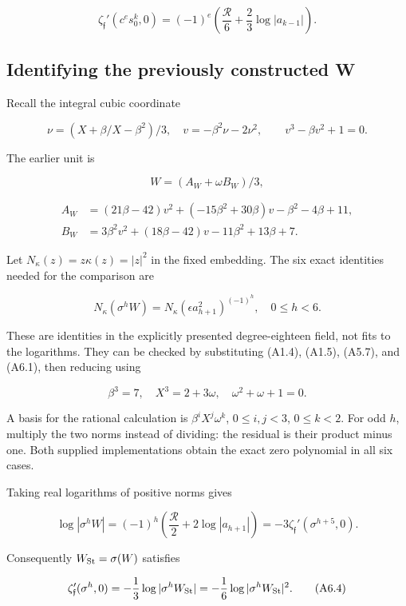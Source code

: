 \[
\boxed{\zeta_{\mathfrak f}'(c^e s_0^k,0)
=(-1)^e\left(\frac{\mathcal R}{6}+\frac23\log|a_{k-1}|\right).} \tag{A5.10}
\]

\hypertarget{A-identifying-the-previously-constructed-w}{%
\subsection{Identifying the previously constructed
W}\label{A-identifying-the-previously-constructed-w}}

Recall the integral cubic coordinate

\[
\nu=(X+\beta/X-\beta^2)/3,\quad v=-\beta^2\nu-2\nu^2,
\qquad v^3-\beta v^2+1=0.
\]

The earlier unit is

\[
W=(A_W+\omega B_W)/3,
\]

\[
\begin{aligned}
A_W&=(21\beta-42)v^2+(-15\beta^2+30\beta)v-\beta^2-4\beta+11,\\
B_W&=3\beta^2v^2+(18\beta-42)v-11\beta^2+13\beta+7.
\end{aligned} \tag{A6.1}
\]

Let \(N_\kappa(z)=z\kappa(z)=|z|^2\) in the fixed embedding. The six
exact identities needed for the comparison are

\[
\boxed{N_\kappa(\sigma^hW)
=N_\kappa(\epsilon a_{h+1}^2)^{(-1)^h},\quad 0\le h<6.} \tag{A6.2}
\]

These are identities in the explicitly presented degree-eighteen field,
not fits to the logarithms. They can be checked by substituting (A1.4),
(A1.5), (A5.7), and (A6.1), then reducing using

\[
\beta^3=7,\quad X^3=2+3\omega,\quad \omega^2+\omega+1=0.
\]

A basis for the rational calculation is \(\beta^iX^j\omega^k\),
\(0\le i,j<3\), \(0\le k<2\). For odd \(h\), multiply the two norms
instead of dividing: the residual is their product minus one. Both
supplied implementations obtain the exact zero polynomial in all six
cases.

Taking real logarithms of positive norms gives

\[
\log|\sigma^h W|=(-1)^h\left(\frac{\mathcal R}{2}+2\log|a_{h+1}|\right)
=-3\zeta_{\mathfrak f}'(\sigma^{h+5},0). \tag{A6.3}
\]

Consequently \(W_{\rm St}=\sigma(W)\) satisfies

\[
\zeta_{\mathfrak f}'(\sigma^h,0)
=-\frac13\log|\sigma^hW_{\rm St}|
=-\frac16\log|\sigma^hW_{\rm St}|^2. \tag{A6.4}
\]

